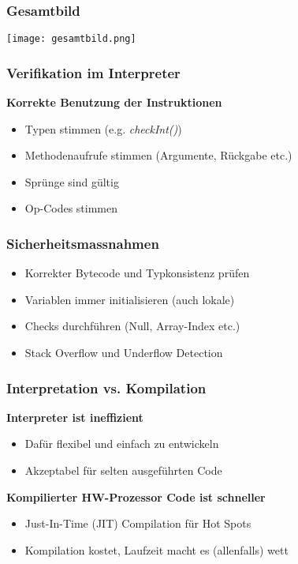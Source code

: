 \subsubsection{Gesamtbild}
\texttt{[image: gesamtbild.png]}

\subsubsection{Verifikation im Interpreter}
\textbf{Korrekte Benutzung der Instruktionen}
\begin{itemize}
    \item Typen stimmen (e.g. \textit{checkInt()})
    \item Methodenaufrufe stimmen (Argumente, Rückgabe etc.)
    \item Sprünge sind gültig
    \item Op-Codes stimmen 
\end{itemize}

\subsubsection{Sicherheitsmassnahmen}
\begin{itemize}
    \item Korrekter Bytecode und Typkonsistenz prüfen
    \item Variablen immer initialisieren (auch lokale)
    \item Checks durchführen (Null, Array-Index etc.)
    \item Stack Overflow und Underflow Detection
\end{itemize}

\subsubsection{Interpretation vs. Kompilation}
\textbf{Interpreter ist ineffizient}
\begin{itemize}
    \item Dafür flexibel und einfach zu entwickeln
    \item Akzeptabel für selten ausgeführten Code
\end{itemize}
\textbf{Kompilierter HW-Prozessor Code ist schneller}
\begin{itemize}
    \item Just-In-Time (JIT) Compilation für Hot Spots
    \item Kompilation kostet, Laufzeit macht es (allenfalls) wett 
\end{itemize}